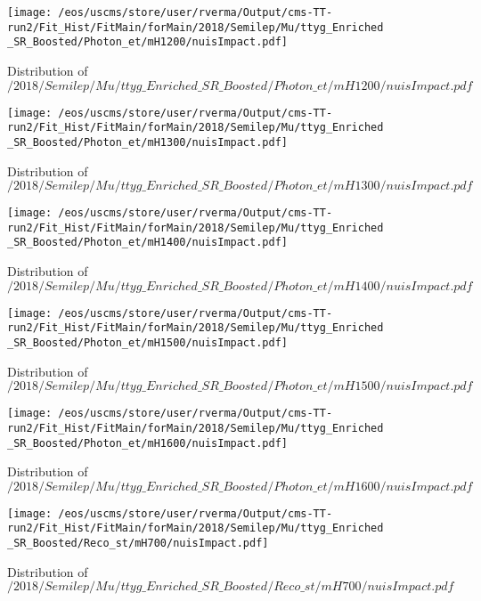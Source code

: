 \begin{figure}
\centering
\texttt{[image: /eos/uscms/store/user/rverma/Output/cms-TT-run2/Fit\_Hist/FitMain/forMain/2018/Semilep/Mu/ttyg\_Enriched\_SR\_Boosted/Photon\_et/mH1200/nuisImpact.pdf]}
\caption{Distribution of $/2018/Semilep/Mu/ttyg\_Enriched\_SR\_Boosted/Photon\_et/mH1200/nuisImpact.pdf$}
\end{figure}

\begin{figure}
\centering
\texttt{[image: /eos/uscms/store/user/rverma/Output/cms-TT-run2/Fit\_Hist/FitMain/forMain/2018/Semilep/Mu/ttyg\_Enriched\_SR\_Boosted/Photon\_et/mH1300/nuisImpact.pdf]}
\caption{Distribution of $/2018/Semilep/Mu/ttyg\_Enriched\_SR\_Boosted/Photon\_et/mH1300/nuisImpact.pdf$}
\end{figure}

\begin{figure}
\centering
\texttt{[image: /eos/uscms/store/user/rverma/Output/cms-TT-run2/Fit\_Hist/FitMain/forMain/2018/Semilep/Mu/ttyg\_Enriched\_SR\_Boosted/Photon\_et/mH1400/nuisImpact.pdf]}
\caption{Distribution of $/2018/Semilep/Mu/ttyg\_Enriched\_SR\_Boosted/Photon\_et/mH1400/nuisImpact.pdf$}
\end{figure}

\begin{figure}
\centering
\texttt{[image: /eos/uscms/store/user/rverma/Output/cms-TT-run2/Fit\_Hist/FitMain/forMain/2018/Semilep/Mu/ttyg\_Enriched\_SR\_Boosted/Photon\_et/mH1500/nuisImpact.pdf]}
\caption{Distribution of $/2018/Semilep/Mu/ttyg\_Enriched\_SR\_Boosted/Photon\_et/mH1500/nuisImpact.pdf$}
\end{figure}

\begin{figure}
\centering
\texttt{[image: /eos/uscms/store/user/rverma/Output/cms-TT-run2/Fit\_Hist/FitMain/forMain/2018/Semilep/Mu/ttyg\_Enriched\_SR\_Boosted/Photon\_et/mH1600/nuisImpact.pdf]}
\caption{Distribution of $/2018/Semilep/Mu/ttyg\_Enriched\_SR\_Boosted/Photon\_et/mH1600/nuisImpact.pdf$}
\end{figure}

\begin{figure}
\centering
\texttt{[image: /eos/uscms/store/user/rverma/Output/cms-TT-run2/Fit\_Hist/FitMain/forMain/2018/Semilep/Mu/ttyg\_Enriched\_SR\_Boosted/Reco\_st/mH700/nuisImpact.pdf]}
\caption{Distribution of $/2018/Semilep/Mu/ttyg\_Enriched\_SR\_Boosted/Reco\_st/mH700/nuisImpact.pdf$}
\end{figure}

